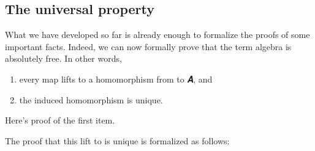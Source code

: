 \documentclass[a4paper,USenglish,cleveref,autoref,thm-restate]{lipics-v2019}
\begin{document}
\subsection{The universal property}\label{sec:the-universal-property}
What we have developed so far is already enough to formalize the proofs of some important facts. Indeed, we can now formally prove that the term algebra \AgdaSymbol{(}\AgdaSymbol{)} is absolutely free.  In other words,
\begin{enumerate}
\item every map \AgdaSpace{}%
\AgdaSymbol{:}\AgdaSpace{}%
\AgdaSpace{}%
\AgdaSpace{}%
\AgdaSpace{}%
\AgdaSpace{}%
 lifts to a homomorphism from \TX to \AB 𝑨, and
\item the induced homomorphism is unique.
\end{enumerate}
Here's proof of the first item. %
\begin{code}\end{code}
The proof that this lift to \AgdaSymbol{(}\AgdaSymbol{)}\AgdaSpace{}%
\AgdaSpace{} is unique is formalized as follows:
\begin{code}\end{code}
\end{document}
